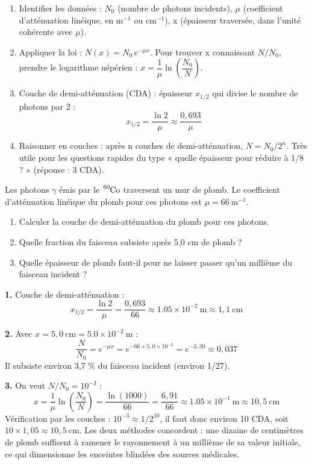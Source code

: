 \documentclass[11pt]{article}
\newcommand{\cle}[1]{{\popxbold\color{popdark}#1}}
\begin{document}
\begin{methode}[Utiliser $N(x) = N_0\,e^{-\mu x}$ et la couche de demi-atténuation]
\begin{enumerate}
\item \cle{Identifier les données} : $N_0$ (nombre de photons incidents), $\mu$ (coefficient d'atténuation linéique, en $\mathrm{m^{-1}}$ ou $\mathrm{cm^{-1}}$), x (épaisseur traversée, dans l'unité cohérente avec $\mu$).
\item \cle{Appliquer la loi} : $N(x) = N_0\,e^{-\mu x}$. Pour trouver x connaissant $N/N_0$, prendre le logarithme népérien : $x = \dfrac{1}{\mu}\ln\!\left(\dfrac{N_0}{N}\right)$.
\item \cle{Couche de demi-atténuation (CDA)} : épaisseur $x_{1/2}$ qui divise le nombre de photons par 2 :
\[ x_{1/2} = \frac{\ln 2}{\mu} \approx \frac{0{,}693}{\mu} \]
\item \cle{Raisonner en couches} : après n couches de demi-atténuation, $N = N_0 / 2^{n}$. Très utile pour les questions rapides du type « quelle épaisseur pour réduire à 1/8 ? » (réponse : 3 CDA).
\end{enumerate}
\end{methode}

\begin{exoresolu}
Les photons $\gamma$ émis par le $\ce{^{60}Co}$ traversent un mur de plomb. Le coefficient d'atténuation linéique du plomb pour ces photons est $\mu = \num{66}\ \mathrm{m^{-1}}$.
\begin{enumerate}
\item Calculer la couche de demi-atténuation du plomb pour ces photons.
\item Quelle fraction du faisceau subsiste après 5,0 cm de plomb ?
\item Quelle épaisseur de plomb faut-il pour ne laisser passer qu'un millième du faisceau incident ?
\end{enumerate}
\tcblower
\textbf{1.} Couche de demi-atténuation :
\[ x_{1/2} = \frac{\ln 2}{\mu} = \frac{0{,}693}{66} \approx \num{1,05}\times 10^{-2}\ \mathrm{m} \approx 1{,}1\ \mathrm{cm} \]

\textbf{2.} Avec $x = 5{,}0\ \mathrm{cm} = \num{5,0}\times 10^{-2}\ \mathrm{m}$ :
\[ \frac{N}{N_0} = e^{-\mu x} = e^{-66 \times 5{,}0\times 10^{-2}} = e^{-3{,}30} \approx 0{,}037 \]
Il subsiste environ 3,7 \% du faisceau incident (environ 1/27).

\textbf{3.} On veut $N/N_0 = 10^{-3}$ :
\[ x = \frac{1}{\mu}\ln\!\left(\frac{N_0}{N}\right) = \frac{\ln(1000)}{66} = \frac{6{,}91}{66} \approx \num{1,05}\times 10^{-1}\ \mathrm{m} \approx 10{,}5\ \mathrm{cm} \]
Vérification par les couches : $10^{-3} \approx 1/2^{10}$, il faut donc environ 10 CDA, soit $10 \times 1{,}05 \approx 10{,}5\ \mathrm{cm}$. Les deux méthodes concordent : une dizaine de centimètres de plomb suffisent à ramener le rayonnement à un millième de sa valeur initiale, ce qui dimensionne les enceintes blindées des sources médicales.
\end{exoresolu}
\end{document}
